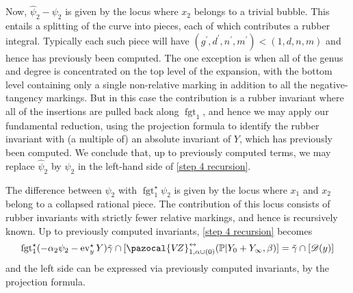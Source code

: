 \documentclass[11pt]{amsart}
\newcommand{\VZ}{\pazocal{V\!Z}}
\newcommand{\st}{\star}
\newcommand{\ev}{\operatorname{ev}}
\newcommand{\fgt}{\operatorname{fgt}}
\newcommand{\Dcal}{\mathcal{D}}
\theoremstyle{definition}
\theoremstyle{definition}
\begin{document}
Now, $\hat\psi_2 - \psi_2$ is given by the locus where $x_2$ belongs to a trivial bubble. This entails a splitting of the curve into pieces, each of which contributes a rubber integral. Typically each such piece will have $(g^\prime,d^\prime,n^\prime,m^\prime) < (1,d,n,m)$ and hence has previously been computed. The one exception is when all of the genus and degree is concentrated on the top level of the expansion, with the bottom level containing only a single non-relative marking in addition to all the negative-tangency markings. But in this case the contribution is a rubber invariant where all of the insertions are pulled back along $\fgt_1$, and hence we may apply our fundamental reduction, using the projection formula to identify the rubber invariant with (a multiple of) an absolute invariant of $Y$, which has previously been computed. We conclude that, up to previously computed terms, we may replace $\hat\psi_2$ by $\psi_2$ in the left-hand side of \eqref{step 4 recursion}.

The difference between $\psi_2$ with $\fgt_1^\st \psi_2$ is given by the locus where $x_1$ and $x_2$ belong to a collapsed rational piece. The contribution of this locus consists of rubber invariants with strictly fewer relative markings, and hence is recursively known. Up to previously computed invariants, \eqref{step 4 recursion} becomes
\begin{equation}\label{step 4 recursion 2} \fgt_1^\st (-\alpha_2\psi_2 - \ev_y^\st Y)\tilde\gamma \cap [\VZ^{\leftrightarrow}_{1,\alpha\cup(0)}(\mathbb P|Y_0+Y_\infty,\beta)] = \tilde\gamma\cap[\Dcal(y)]\end{equation}
and the left side can be expressed via previously computed invariants, by the projection formula. \medskip
\end{document}
